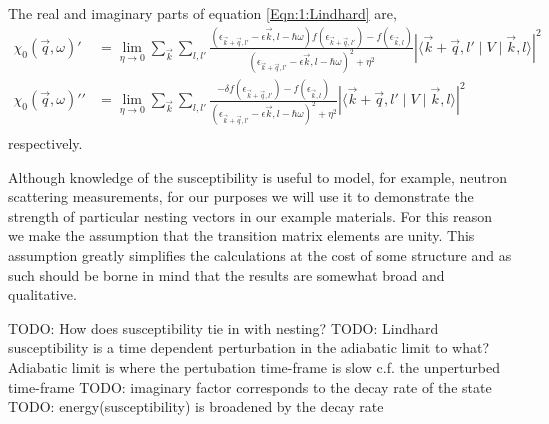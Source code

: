 The real and imaginary parts of equation \ref{Eqn:1:Lindhard} are,
\begin{align}
\chi_0(\vec{q}, \omega)\prime &= \lim_{\eta \to 0} \sum_{\vec{k}}\sum_{l, l\prime}\frac{(\epsilon_{\vec{k}+\vec{q},l\prime} - \epsilon{\vec{k},l} - \hbar\omega) f(\epsilon_{\vec{k}+\vec{q},l\prime}) - f(\epsilon_{\vec{k},l})}{(\epsilon_{\vec{k}+\vec{q},l\prime} - \epsilon{\vec{k},l} - \hbar\omega)^2 + \eta^2}|\langle \vec{k}+\vec{q},l\prime \mid  V \mid \vec{k},l \rangle|^2 \\
\chi_0(\vec{q}, \omega)\prime\prime &= \lim_{\eta \to 0} \sum_{\vec{k}}\sum_{l, l\prime}\frac{-\delta f(\epsilon_{\vec{k}+\vec{q},l\prime}) - f(\epsilon_{\vec{k},l})}{(\epsilon_{\vec{k}+\vec{q},l\prime} - \epsilon{\vec{k},l} - \hbar\omega)^2 + \eta^2}|\langle \vec{k}+\vec{q},l\prime \mid  V \mid \vec{k},l \rangle|^2 \\
\end{align}
respectively.

Although knowledge of the susceptibility is useful to model, for example, neutron scattering measurements, for our purposes we will use it to demonstrate the strength of particular nesting vectors in our example materials. For this reason we make the assumption that the transition matrix elements are unity. This assumption greatly simplifies the calculations at the cost of some structure and as such should be borne in mind that the results are somewhat broad and qualitative.


TODO: How does susceptibility tie in with nesting?
TODO: Lindhard susceptibility is a time dependent perturbation in the adiabatic limit to what? Adiabatic limit is where the pertubation time-frame is slow c.f. the unperturbed time-frame 
TODO: imaginary factor corresponds to the decay rate of the state
TODO: energy(susceptibility) is broadened by the decay rate





